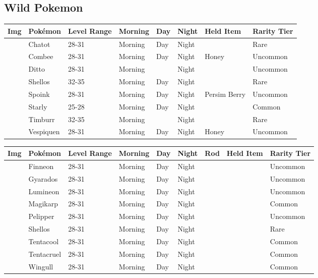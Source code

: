 \subsection{Wild Pokemon}%
\label{subsec:WildPokemon}%
\begin{longtable}{||l l l l l l l l||}%
\hline%
Img&Pokémon&Level Range&Morning&Day&Night&Held Item&Rarity Tier\\%
\hline%
\endhead%
\hline%
&Chatot&28{-}31&Morning&Day&Night&&Rare\\%
\hline%
&Combee&28{-}31&Morning&Day&Night&Honey&Uncommon\\%
\hline%
&Ditto&28{-}31&Morning&&Night&&Uncommon\\%
\hline%
&Shellos&32{-}35&Morning&Day&Night&&Rare\\%
\hline%
&Spoink&28{-}31&Morning&Day&Night&Persim Berry&Uncommon\\%
\hline%
&Starly&25{-}28&Morning&Day&Night&&Common\\%
\hline%
&Timburr&32{-}35&Morning&&Night&&Rare\\%
\hline%
&Vespiquen&28{-}31&Morning&Day&Night&Honey&Uncommon\\%
\hline%
\end{longtable}%
\begin{longtable}{||l l l l l l l l l||}%
\hline%
Img&Pokémon&Level Range&Morning&Day&Night&Rod&Held Item&Rarity Tier\\%
\hline%
\endhead%
\hline%
&Finneon&28{-}31&Morning&Day&Night&&&Uncommon\\%
\hline%
&Gyarados&28{-}31&Morning&Day&Night&&&Uncommon\\%
\hline%
&Lumineon&28{-}31&Morning&Day&Night&&&Uncommon\\%
\hline%
&Magikarp&28{-}31&Morning&Day&Night&&&Common\\%
\hline%
&Pelipper&28{-}31&Morning&Day&Night&&&Uncommon\\%
\hline%
&Shellos&28{-}31&Morning&Day&Night&&&Rare\\%
\hline%
&Tentacool&28{-}31&Morning&Day&Night&&&Common\\%
\hline%
&Tentacruel&28{-}31&Morning&Day&Night&&&Common\\%
\hline%
&Wingull&28{-}31&Morning&Day&Night&&&Common\\%
\hline%
\end{longtable}